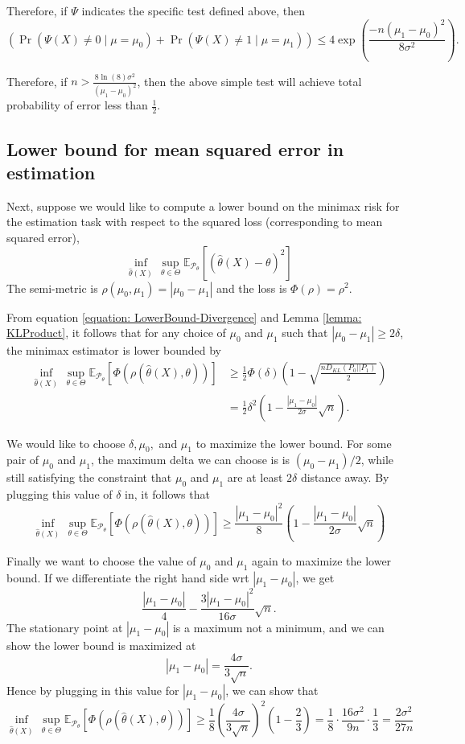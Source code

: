 \documentclass{article}
\newcommand{\Pd}{\mathcal{P}}
\newcommand{\Ev}{\mathbb{E}}
\begin{document}
	Therefore, if $\Psi$ indicates the specific test defined above, then
	\[\left( \Pr(\Psi(X) \neq 0 \mid \mu = \mu_0) + \Pr(\Psi(X) \neq 1 \mid \mu = \mu_1) \right) \leq 4 \exp\left(\frac{-n (\mu_1 - \mu_0)^2}{8\sigma^2}\right).\]
	
	Therefore, if $n > \frac{8 \ln(8) \sigma^2}{(\mu_1 - \mu_0)^2}$, then the above simple test will achieve total probability of error less than $\frac12$. 
	
	\subsection{Lower bound for mean squared error in estimation}
	Next, suppose we would like to compute a lower bound on the minimax risk for the estimation task with respect to the squared loss (corresponding to mean squared error),
	\[ \inf_{\hat\theta(X)} \, \sup_{\theta \in \Theta} \Ev_{\Pd_\theta} \left[ (\hat\theta(X) - \theta)^2 \right]\]
	The semi-metric is $\rho(\mu_0,\mu_1) = |\mu_0 - \mu_1|$ and the loss is $\Phi(\rho) = \rho^2$.
	
	From equation \ref{equation: LowerBound-Divergence} and Lemma 
	\ref{lemma: KLProduct}, it follows that for any choice of $\mu_0$ and $\mu_1$ such that $|\mu_0 - \mu_1| \geq 2\delta$, the minimax estimator is lower bounded by
	\begin{align*}
	\inf_{\hat\theta(X)} \, \sup_{\theta \in \Theta} \Ev_{\Pd_\theta} \left[ \Phi(\rho(\hat\theta(X),\theta))\right] &\geq \frac{1}{2}\Phi(\delta) \left( 1 -  \sqrt{\frac{nD_{KL}(P_0 || P_1)}{2}} \right) \\
	&= \frac{1}{2}\delta^2 \left(1 -  \frac{|\mu_1 - \mu_0|}{2\sigma}\sqrt{n}\right).
	\end{align*}
	
	We would like to choose $\delta, \mu_0,$ and $\mu_1$ to maximize the lower bound. For some pair of $\mu_0$ and $\mu_1$, the maximum delta we can choose is is $(\mu_0 - \mu_1)/2$, while still satisfying the constraint that $\mu_0$ and $\mu_1$ are at least $2\delta$ distance away. By plugging this value of $\delta$ in, it follows that
	\[
	\inf_{\hat\theta(X)} \, \sup_{\theta \in \Theta} \Ev_{\Pd_\theta} \left[ \Phi(\rho(\hat\theta(X),\theta))\right] \geq \frac{|\mu_1 - \mu_0|^2}{8} \left( 1 -  \frac{|\mu_1 - \mu_0|}{2\sigma}\sqrt{n} 
	\right)
	\]
	
	Finally we want to choose the value of $\mu_0$ and $\mu_1$ again to maximize the lower bound. If we differentiate the right hand side wrt $|\mu_1-\mu_0|$, we get
	\[\frac{|\mu_1 - \mu_0|}{4}   -  \frac{3|\mu_1 - \mu_0|^2}{16\sigma}\sqrt{n}.\]
	The stationary point at $|\mu_1-\mu_0|$ is a maximum not a minimum, and we can show the lower bound is maximized at
	\[|\mu_1-\mu_0| = \frac{4\sigma}{3\sqrt{n}}.\]
	Hence by plugging in this value for $|\mu_1-\mu_0|$, we can show that 
	\[
	\inf_{\hat\theta(X)} \, \sup_{\theta \in \Theta} \Ev_{\Pd_\theta} \left[ \Phi(\rho(\hat\theta(X),\theta))\right] \geq \frac{1}{8}\left(\frac{4\sigma}{3\sqrt{n}}\right)^2\left(1 - \frac{2}{ 3}\right) = \frac{1}{8}\cdot\frac{16\sigma^2}{9n} \cdot \frac{1}{3} =
	\frac{2\sigma^2}{27 n} \]
	
\end{document}
